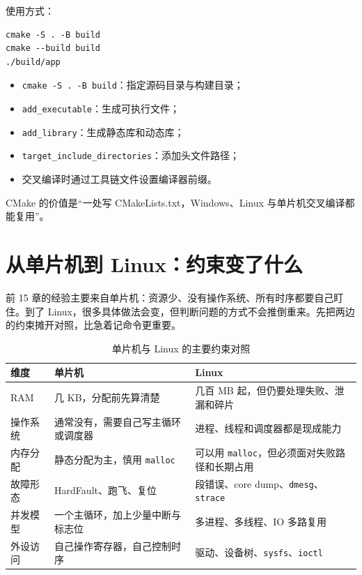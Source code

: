 使用方式：

\begin{lstlisting}
cmake -S . -B build
cmake --build build
./build/app
\end{lstlisting}

\begin{itemize}
\item \texttt{cmake -S . -B build}：指定源码目录与构建目录；
\item \texttt{add\_executable}：生成可执行文件；
\item \texttt{add\_library}：生成静态库和动态库；
\item \texttt{target\_include\_directories}：添加头文件路径；
\item 交叉编译时通过工具链文件设置编译器前缀。
\end{itemize}

CMake 的价值是“一处写 CMakeLists.txt，Windows、Linux 与单片机交叉编译都能复用”。

\section{从单片机到 Linux：约束变了什么}

前 15 章的经验主要来自单片机：资源少、没有操作系统、所有时序都要自己盯住。到了 Linux，很多具体做法会变，但判断问题的方式不会推倒重来。先把两边的约束摊开对照，比急着记命令更重要。

\begin{table}[htbp]
\centering
\caption{单片机与 Linux 的主要约束对照}
\label{tab:mcu-linux-constraints}
\begin{tabularx}{\textwidth}{lXX}
\toprule
维度 & 单片机 & Linux \\
\midrule
RAM & 几 KB，分配前先算清楚 & 几百 MB 起，但仍要处理失败、泄漏和碎片 \\
操作系统 & 通常没有，需要自己写主循环或调度器 & 进程、线程和调度器都是现成能力 \\
内存分配 & 静态分配为主，慎用 \texttt{malloc} & 可以用 \texttt{malloc}，但必须面对失败路径和长期占用 \\
故障形态 & HardFault、跑飞、复位 & 段错误、core dump、\texttt{dmesg}、\texttt{strace} \\
并发模型 & 一个主循环，加上少量中断与标志位 & 多进程、多线程、IO 多路复用 \\
外设访问 & 自己操作寄存器，自己控制时序 & 驱动、设备树、\texttt{sysfs}、\texttt{ioctl} \\
\bottomrule
\end{tabularx}
\end{table}


